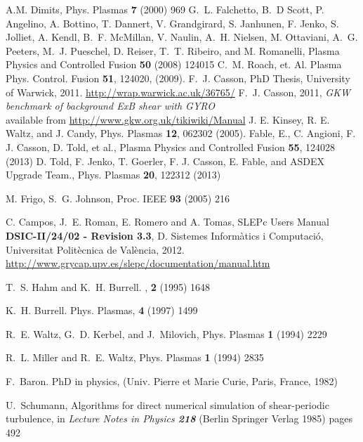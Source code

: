 \begin{thebibliography}{10}
 A.M. Dimits, Phys. Plasmas {\bf 7} (2000) 969  
G.~L. Falchetto, B.~D Scott, P. Angelino, A. Bottino, T. Dannert, V. Grandgirard,
  S. Janhunen, F. Jenko, S. Jolliet, A. Kendl, B.~F. McMillan, V. Naulin, A.~H. Nielsen,
  M. Ottaviani, A.~G. Peeters, M.~J. Pueschel, D. Reiser, T.~T. Ribeiro, and
  M. Romanelli, Plasma Physics and Controlled Fusion {\bf 50} (2008) 124015 
 C.~M. Roach, et. Al. Plasma Phys. Control. Fusion {\bf 51}, 124020, (2009).
 F.~J. Casson, PhD Thesis, University of Warwick, 2011. \href{http://wrap.warwick.ac.uk/36765/}{http://wrap.warwick.ac.uk/36765/}
 F.~J. Casson, 2011, \textit{GKW benchmark of background ExB shear with GYRO}\\
 available from \href{http://www.gkw.org.uk/tikiwiki/Manual}{http://www.gkw.org.uk/tikiwiki/Manual}
 J. E. Kinsey, R. E. Waltz, and J. Candy, Phys. Plasmas {\bf 12}, 062302 (2005).
 Fable, E., C. Angioni, F. J. Casson, D. Told, et al., Plasma Physics and Controlled Fusion {\bf 55}, 124028 (2013)
 D. Told, F. Jenko, T. Goerler, F. J. Casson, E. Fable, and ASDEX Upgrade Team., Phys. Plasmas {\bf 20}, 122312 (2013)

 M. Frigo, S.~G. Johnson, Proc. IEEE {\bf 93} (2005) 216

 C. Campos, J.~E. Roman, E. Romero and A. Tomas, SLEPc Users Manual {\bf DSIC-II/24/02 - Revision 3.3},
  D. Sistemes Inform\`atics i Computaci\'o, Universitat Polit\`ecnica de Val\`encia, 2012.
  \href{http://www.grycap.upv.es/slepc/documentation/manual.htm}{http://www.grycap.upv.es/slepc/documentation/manual.htm}

T.~S. Hahm and K.~H. Burrell.
, {\bf 2} (1995) 1648

K.~H. Burrell.
\newblock Phys. Plasmas, {\bf 4} (1997) 1499

R.~E. Waltz, G.~D. Kerbel, and J.~Milovich, Phys. Plasmas {\bf 1} (1994) 2229

R.~L. Miller and R.~E. Waltz, Phys. Plasmas {\bf 1} (1994) 2835

F.~Baron. {PhD} in physics, (Univ. Pierre et Marie Curie, Paris, France, 1982) 

U.~{Schumann}, {Algorithms for direct numerical simulation of shear-periodic
  turbulence}, in {\em Lecture Notes in
  Physics {\bf 218}} (Berlin Springer Verlag 1985) pages 492


\end{thebibliography}
